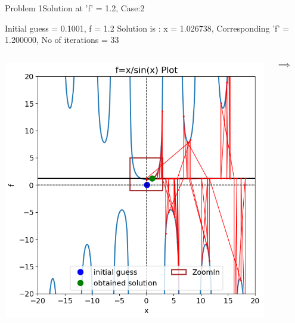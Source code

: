 \documentclass{beamer}
\begin{document}
\begin{frame}{Problem 1}{Solution at 'f' = 1.2, Case:2}
    \begin{block}{\footnotesize Initial guess = 0.1001, f = 1.2}
        \footnotesize
        Solution is : x = 1.026738, Corresponding 'f' = 1.200000, No of iterations = 33
    \end{block}
    \vspace{-0.5em}
    \begin{columns}
        \begin{block}{}
            \includegraphics[width=\textwidth]{Figures/prob1_sol21.png}
        \end{block}
        \[\implies\]
        \begin{block}{}

\end{block}
\end{columns}
\end{frame}
\end{document}
